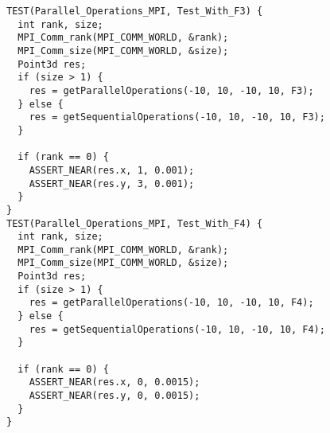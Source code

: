 \documentclass{report}
\begin{document}
\begin{lstlisting}
TEST(Parallel_Operations_MPI, Test_With_F3) {
  int rank, size;
  MPI_Comm_rank(MPI_COMM_WORLD, &rank);
  MPI_Comm_size(MPI_COMM_WORLD, &size);
  Point3d res;
  if (size > 1) {
    res = getParallelOperations(-10, 10, -10, 10, F3);
  } else {
    res = getSequentialOperations(-10, 10, -10, 10, F3);
  }

  if (rank == 0) {
    ASSERT_NEAR(res.x, 1, 0.001);
    ASSERT_NEAR(res.y, 3, 0.001);
  }
}
TEST(Parallel_Operations_MPI, Test_With_F4) {
  int rank, size;
  MPI_Comm_rank(MPI_COMM_WORLD, &rank);
  MPI_Comm_size(MPI_COMM_WORLD, &size);
  Point3d res;
  if (size > 1) {
    res = getParallelOperations(-10, 10, -10, 10, F4);
  } else {
    res = getSequentialOperations(-10, 10, -10, 10, F4);
  }

  if (rank == 0) {
    ASSERT_NEAR(res.x, 0, 0.0015);
    ASSERT_NEAR(res.y, 0, 0.0015);
  }
}


\end{lstlisting}
\end{document}
